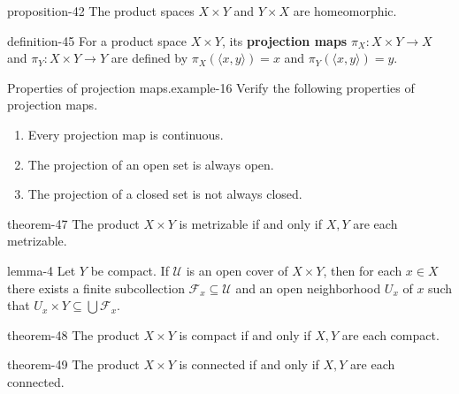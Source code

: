 \documentclass[10pt,]{article}
\newcommand{\terminology}[1]{\textbf{#1}}
\newcommand{\tuple}[1]{\langle #1 \rangle}
\newcommand{\mc}{\mathcal}
\begin{document}
\begin{proposition}{}{}{proposition-42}%
\hypertarget{p-181}{}%
The product spaces \(X\times Y\) and \(Y\times X\) are homeomorphic.%
\end{proposition}
\begin{definition}{}{definition-45}%
\hypertarget{p-182}{}%
For a product space \(X\times Y\), its \terminology{projection maps} \(\pi_X:X\times Y\to X\) and \(\pi_Y:X\times Y\to Y\) are defined by \(\pi_X(\tuple{x,y})=x\) and \(\pi_Y(\tuple{x,y})=y\).%
\end{definition}
\begin{example}{Properties of projection maps.}{example-16}%
\hypertarget{p-183}{}%
Verify the following properties of projection maps.%
\leavevmode%
\begin{enumerate}
\item\hypertarget{li-113}{}Every projection map is continuous.%
\item\hypertarget{li-114}{}The projection of an open set is always open.%
\item\hypertarget{li-115}{}The projection of a closed set is not always closed.%
\end{enumerate}
\end{example}
\begin{theorem}{}{}{theorem-47}%
\hypertarget{p-184}{}%
The product \(X\times Y\) is metrizable if and only if \(X,Y\) are each metrizable.%
\end{theorem}
\begin{lemma}{}{}{lemma-4}%
\hypertarget{p-185}{}%
Let \(Y\) be compact. If \(\mc U\) is an open cover of \(X\times Y\), then for each \(x\in X\) there exists a finite subcollection \(\mc F_x\subseteq\mc U\) and an open neighborhood \(U_x\) of \(x\) such that \(U_x\times Y\subseteq\bigcup\mc F_x\).%
\end{lemma}
\begin{theorem}{}{}{theorem-48}%
\hypertarget{p-186}{}%
The product \(X\times Y\) is compact if and only if \(X,Y\) are each compact.%
\end{theorem}
\begin{theorem}{}{}{theorem-49}%
\hypertarget{p-187}{}%
The product \(X\times Y\) is connected if and only if \(X,Y\) are each connected.%
\end{theorem}
%
%
\typeout{************************************************}
\typeout{************************************************}
%
\end{document}
